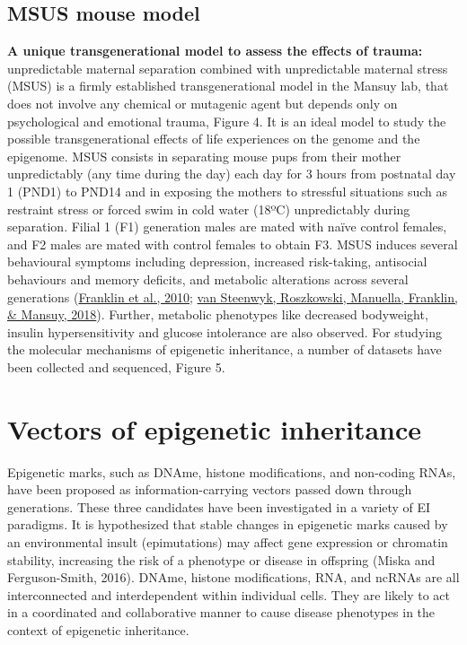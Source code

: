\documentclass[12pt,twoside]{reedthesis}
\begin{document}
\hypertarget{msus-mouse-model}{%
\subsection*{MSUS mouse model}\label{msus-mouse-model}}

\textbf{A unique transgenerational model to assess the effects of trauma:}
unpredictable maternal separation combined with unpredictable maternal
stress (MSUS) is a firmly established transgenerational model in the
Mansuy lab, that does not involve any chemical or mutagenic agent but
depends only on psychological and emotional trauma, Figure 4. It is an
ideal model to study the possible transgenerational effects of life
experiences on the genome and the epigenome. MSUS consists in separating
mouse pups from their mother unpredictably (any time during the day)
each day for 3 hours from postnatal day 1 (PND1) to PND14 and in
exposing the mothers to stressful situations such as restraint stress or
forced swim in cold water (18ºC) unpredictably during separation. Filial
1 (F1) generation males are mated with naïve control females, and F2
males are mated with control females to obtain F3. MSUS induces several
behavioural symptoms including depression, increased risk-taking,
antisocial behaviours and memory deficits, and metabolic alterations
across several generations (\protect\hyperlink{ref-franklin2010}{Franklin et al., 2010}; \protect\hyperlink{ref-vansteenwyk2018}{van Steenwyk, Roszkowski, Manuella, Franklin, \& Mansuy, 2018}). Further,
metabolic phenotypes like decreased bodyweight, insulin hypersensitivity
and glucose intolerance are also observed. For studying the molecular
mechanisms of epigenetic inheritance, a number of datasets have been
collected and sequenced, Figure 5.

\hypertarget{vectors-of-epigenetic-inheritance}{%
\section*{Vectors of epigenetic inheritance}\label{vectors-of-epigenetic-inheritance}}

Epigenetic marks, such as DNAme, histone modifications, and non-coding
RNAs, have been proposed as information-carrying vectors passed down
through generations. These three candidates have been investigated in a
variety of EI paradigms. It is hypothesized that stable changes in
epigenetic marks caused by an environmental insult (epimutations) may
affect gene expression or chromatin stability, increasing the risk of a
phenotype or disease in offspring (Miska and Ferguson-Smith, 2016).
DNAme, histone modifications, RNA, and ncRNAs are all interconnected and
interdependent within individual cells. They are likely to act in a
coordinated and collaborative manner to cause disease phenotypes in the
context of epigenetic inheritance.
\end{document}
